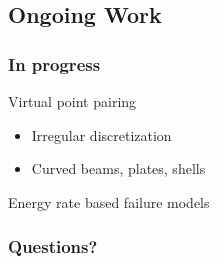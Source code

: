 \documentclass{beamer}
\begin{document}
\subsection{Ongoing Work}
%
\begin{frame}
\frametitle{In progress}
  Virtual point pairing
  \begin{itemize}
    \item Irregular discretization
    \item Curved beams, plates, shells
  \end{itemize}
  Energy rate based failure models

\end{frame}
%
\begin{frame}
  \frametitle{Questions?}
\end{frame}
%

\setcounter{finalframe}{\value{framenumber}}

\setcounter{framenumber}{\value{finalframe}}
%
\end{document}
